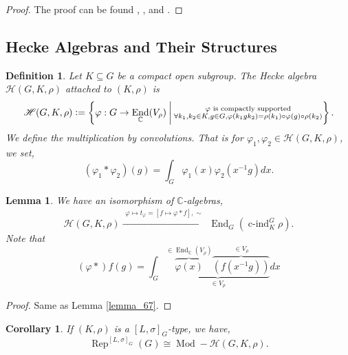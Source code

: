 \documentclass[8pt]{article}
\newtheorem{definition}{Definition}[section]
\newtheorem{lemma}{Lemma}[section]
\newtheorem{corollary}{Corollary} [section]
\DeclareMathOperator{\cind}{c-ind}
\DeclareMathOperator{\Rep}{Rep}
\DeclareMathOperator{\End}{End}
\DeclareMathOperator{\Mod}{Mod}
\newcommand{\defeq}{\vcentcolon=}
\newcommand{\C}[0]{\mathbb{C}}
\newcommand{\hecke}[0]{\mathscr{H}}
\begin{document}
\begin{proof}
  The proof can be found \cite{Ohara}, \cite{Blondel}, and \cite{Dat}.
\end{proof}

\subsection{Hecke Algebras and Their Structures}

\begin{definition}
  Let $K\subseteq G$ be a compact open subgroup. The Hecke algebra $\hecke(G,K,\rho)$ attached to $(K,\rho)$ is 
  \begin{equation*}
    \hecke(G,K,\rho)\defeq\left\{\varphi:G\to\End_\C(V_\rho)\:\bigg{|}\:\substack{\text{$\varphi$ is compactly supported}\\\forall k_1,k_2\in K,g\in G,\varphi(k_1gk_2)=\rho(k_1)\circ\varphi(g)\circ\rho(k_2)}\right\}.
  \end{equation*}
  We define the multiplication by convolutions. That is for $\varphi_1,\varphi_2\in\hecke(G,K,\rho)$, we set,
  \begin{equation*}
    (\varphi_1\ast\varphi_2)(g)=\int_G\varphi_1(x)\varphi_2(x^{-1}g)dx.
  \end{equation*}
\end{definition}

\begin{lemma}
  \label{lemma_121}
  We have an isomorphism of $\C$-algebras,
  \begin{equation*}
    \hecke(G,K,\rho)\stackrel{\substack{\varphi\mapsto t_\varphi = [f\mapsto\varphi\ast f],\sim}}{\to}\End_G(\cind_K^G\rho).
  \end{equation*}
  Note that
  \begin{equation*}
    (\varphi\ast )f(g) = \int_G\underbrace{\overbrace{\varphi(x)}^{\in\End_\C(V_\rho)}\overbrace{(f(x^{-1}g))}^{\in V_\rho}}_{\in V_\rho}dx
  \end{equation*}
\end{lemma}

\begin{proof}
  Same as Lemma \ref{lemma_67}.
\end{proof}

\begin{corollary}
  \label{corollary_122}
  If $(K,\rho)$ is a $[L,\sigma]_G$-type, we have,
  \begin{equation*}
    \Rep^{[L,\sigma]_G}(G)\cong\Mod-\hecke(G,K,\rho).
  \end{equation*}
\end{corollary}
\end{document}
